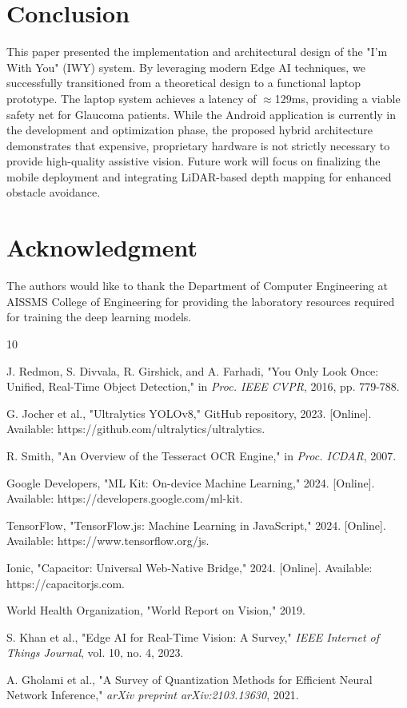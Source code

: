 \documentclass[11pt, a4paper, twocolumn]{article}
\begin{document}
\section{Conclusion}
This paper presented the implementation and architectural design of the "I'm With You" (IWY) system. By leveraging modern Edge AI techniques, we successfully transitioned from a theoretical design to a functional laptop prototype. The laptop system achieves a latency of $\approx$129ms, providing a viable safety net for Glaucoma patients. While the Android application is currently in the development and optimization phase, the proposed hybrid architecture demonstrates that expensive, proprietary hardware is not strictly necessary to provide high-quality assistive vision. Future work will focus on finalizing the mobile deployment and integrating LiDAR-based depth mapping for enhanced obstacle avoidance.

\section*{Acknowledgment}
The authors would like to thank the Department of Computer Engineering at AISSMS College of Engineering for providing the laboratory resources required for training the deep learning models.

\begin{thebibliography}{10}

J. Redmon, S. Divvala, R. Girshick, and A. Farhadi, "You Only Look Once: Unified, Real-Time Object Detection," in \textit{Proc. IEEE CVPR}, 2016, pp. 779-788.

G. Jocher et al., "Ultralytics YOLOv8," GitHub repository, 2023. [Online]. Available: https://github.com/ultralytics/ultralytics.

R. Smith, "An Overview of the Tesseract OCR Engine," in \textit{Proc. ICDAR}, 2007.

Google Developers, "ML Kit: On-device Machine Learning," 2024. [Online]. Available: https://developers.google.com/ml-kit.

TensorFlow, "TensorFlow.js: Machine Learning in JavaScript," 2024. [Online]. Available: https://www.tensorflow.org/js.

Ionic, "Capacitor: Universal Web-Native Bridge," 2024. [Online]. Available: https://capacitorjs.com.

World Health Organization, "World Report on Vision," 2019.

S. Khan et al., "Edge AI for Real-Time Vision: A Survey," \textit{IEEE Internet of Things Journal}, vol. 10, no. 4, 2023.

A. Gholami et al., "A Survey of Quantization Methods for Efficient Neural Network Inference," \textit{arXiv preprint arXiv:2103.13630}, 2021.

\end{thebibliography}
\end{document}
